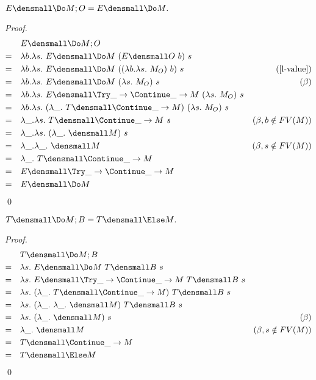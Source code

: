 \begin{lemma}
  \label{thm:ext-commit}
  $ E\den{\Do M; O} = E\den{\Do M}.$
\end{lemma}
\begin{proof}
  \begin{align*}
    &\quad
    E\den{\Do M; O}
    \\
    =& \quad
    \lambda b. \lambda s.~ E\den{\Do M} ~(E\den{O} ~b) ~s
    \\
    =& \quad
    \lambda b. \lambda s.~ E\den{\Do M} ~((\lambda b. \lambda s.~ M_O) ~b) ~s
    & (\cref{l-value})
    \\
    =& \quad
    \lambda b. \lambda s.~ E\den{\Do M} ~(\lambda s.~ M_O) ~s
    & (\beta)
    \\
    =& \quad
    \lambda b. \lambda s.~ E\den{\Try \_ \to \Continue \_ \to M} ~(\lambda s.~ M_O) ~s
    \\
    =& \quad
    \lambda b. \lambda s.~ (\lambda \_. ~T\den{\Continue \_ \to M}) ~(\lambda s.~ M_O) ~s
    \\
    =& \quad
    \lambda \_. \lambda s.~ T\den{\Continue \_ \to M} ~s
    & (\beta, b \notin FV(M))
    \\
    =& \quad
    \lambda \_. \lambda s.~ (\lambda \_. ~ \den{M}) ~s
    \\
    =& \quad
    \lambda \_. \lambda \_.~ \den{M}
    & (\beta, s \notin FV(M))
    \\
    =& \quad
    \lambda \_. ~T\den{\Continue \_ \to M}
    \\
    =&\quad
    E\den{\Try \_ \to \Continue \_ \to M}
    \\
    =&\quad
    E\den{\Do M}
  \end{align*}
  \qed
\end{proof}

\begin{lemma}
  \label{thm:template-commit}
  $ T\den{\Do M; B} = T\den{\Else M}.$
\end{lemma}
\begin{proof}
  \begin{align*}
    &\quad
    T\den{\Do M; B}
    \\
    =& \quad
    \lambda s. ~ E\den{\Do M} ~T\den{B} ~s
    \\
    =& \quad
    \lambda s. ~ E\den{\Try \_ \to \Continue \_ \to M} ~T\den{B} ~s
    \\
    =& \quad
    \lambda s. ~ (\lambda \_. ~T\den{\Continue \_ \to M}) ~T\den{B} ~s
    \\
    =& \quad
    \lambda s. ~ (\lambda \_. ~\lambda \_. ~  \den{M}) ~T\den{B} ~s
    \\
    =& \quad
    \lambda s. ~ (\lambda \_. ~  \den{M}) ~s
    & (\beta)
    \\
    =& \quad
    \lambda \_. ~ \den{M}
    & (\beta, s \notin FV(M))
    \\
    =& \quad
    T\den{\Continue \_ \to M}
    \\
    =& \quad
    T\den{\Else M}
  \end{align*}
  \qed
\end{proof}

